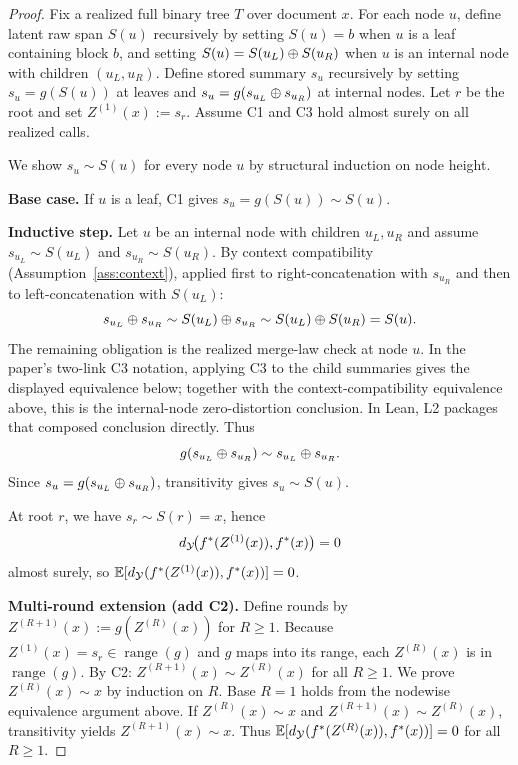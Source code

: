 \begin{proof}
Fix a realized full binary tree $T$ over document $x$.
For each node $u$, define latent raw span $S(u)$ recursively by setting $S(u) = b$ when $u$ is a leaf containing block $b$, and setting $S(u) = S(u_L) \oplus S(u_R)$ when $u$ is an internal node with children $(u_L, u_R)$.
Define stored summary $s_u$ recursively by setting $s_u = g(S(u))$ at leaves and $s_u = g(s_{u_L} \oplus s_{u_R})$ at internal nodes.
Let $r$ be the root and set $Z^{(1)}(x) := s_r$.
Assume C1 and C3 hold almost surely on all realized calls.

We show $s_u \sim S(u)$ for every node $u$ by structural induction on node height.

\textbf{Base case.} If $u$ is a leaf, C1 gives $s_u = g(S(u)) \sim S(u)$.

\textbf{Inductive step.} Let $u$ be an internal node with children $u_L, u_R$ and assume $s_{u_L} \sim S(u_L)$ and $s_{u_R} \sim S(u_R)$.
By context compatibility (Assumption~\ref{ass:context}), applied first to right-concatenation with $s_{u_R}$ and then to left-concatenation with $S(u_L)$:
\[
s_{u_L} \oplus s_{u_R} \sim S(u_L) \oplus s_{u_R} \sim S(u_L) \oplus S(u_R) = S(u).
\]
The remaining obligation is the realized merge-law check at node $u$. In the paper's two-link C3 notation, applying C3 to the child summaries gives the displayed equivalence below; together with the context-compatibility equivalence above, this is the internal-node zero-distortion conclusion. In Lean, L2 packages that composed conclusion directly. Thus
\[
g(s_{u_L} \oplus s_{u_R}) \sim s_{u_L} \oplus s_{u_R}.
\]
Since $s_u = g(s_{u_L} \oplus s_{u_R})$, transitivity gives $s_u \sim S(u)$.

At root $r$, we have $s_r \sim S(r) = x$, hence
\[
d_{\mathcal{Y}}\!\big(f^\ast(Z^{(1)}(x)), f^\ast(x)\big) = 0
\]
almost surely, so $\mathbb{E}[d_{\mathcal{Y}}(f^\ast(Z^{(1)}(x)), f^\ast(x))] = 0$.

\textbf{Multi-round extension (add C2).}
Define rounds by $Z^{(R+1)}(x) := g(Z^{(R)}(x))$ for $R \ge 1$.
Because $Z^{(1)}(x) = s_r \in \operatorname{range}(g)$ and $g$ maps into its range, each $Z^{(R)}(x)$ is in $\operatorname{range}(g)$.
By C2: $Z^{(R+1)}(x) \sim Z^{(R)}(x)$ for all $R \ge 1$.
We prove $Z^{(R)}(x) \sim x$ by induction on $R$.
Base $R = 1$ holds from the nodewise equivalence argument above.
If $Z^{(R)}(x) \sim x$ and $Z^{(R+1)}(x) \sim Z^{(R)}(x)$, transitivity yields $Z^{(R+1)}(x) \sim x$.
Thus $\mathbb{E}[d_{\mathcal{Y}}(f^\ast(Z^{(R)}(x)), f^\ast(x))] = 0$ for all $R \ge 1$.
\end{proof}

